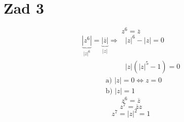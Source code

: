 \documentclass[a4paper]{article}
\title{}
\author{Paweł Stiasny}
\date{\today}
\begin{document}
	\section*{Zad 3}
	\[ z^6 = \overline{z} \]
	\begin{align*}
		\underbrace{| z^6 |}_{|z|^6} = \underbrace{|\overline{z}|}_{|z|} \Rightarrow&
		|z|^6 - |z| = 0 \\
		& |z|(|z|^5 - 1) = 0
	\end{align*}
	\begin{align*}
		&\text{a) } |z| = 0 \Leftrightarrow z = 0 \\
		&\text{b) } |z| = 1
	\end{align*}
	\[ z^6 = \overline{z} \]
	\[ z^7 = \overline{z} z \]
	\[ z^7 = |z|^2 = 1 \]
\end{document}
